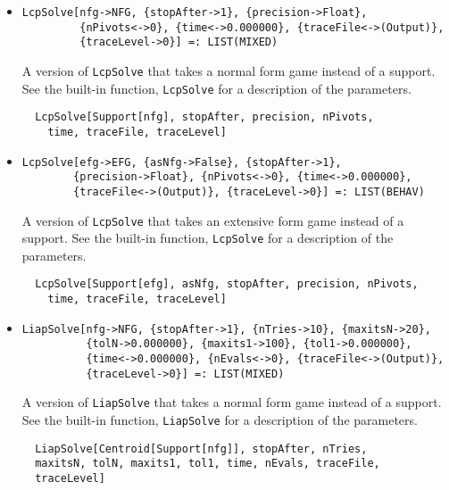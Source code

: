 \begin{itemize}



\item{}
\protect \large \begin{verbatim}
LcpSolve[nfg->NFG, {stopAfter->1}, {precision->Float}, 
         {nPivots<->0}, {time<->0.000000}, {traceFile<->(Output)}, 
         {traceLevel->0}] =: LIST(MIXED) 
\end{verbatim}\normalsize

\bd 
A version of \verb+LcpSolve+ that takes a normal form
game instead of a support.  See the built-in function,
\verb+LcpSolve+ for a description of the parameters.
\begin{verbatim}
  LcpSolve[Support[nfg], stopAfter, precision, nPivots,
    time, traceFile, traceLevel]
\end{verbatim} 
\ed

\item{}
\protect \large \begin{verbatim}
LcpSolve[efg->EFG, {asNfg->False}, {stopAfter->1}, 
        {precision->Float}, {nPivots<->0}, {time<->0.000000}, 
        {traceFile<->(Output)}, {traceLevel->0}] =: LIST(BEHAV) 
\end{verbatim}\normalsize

\bd 
A version of \verb+LcpSolve+ that takes an extensive form
game instead of a support.  See the built-in function,
\verb+LcpSolve+ for a description of the parameters.
\begin{verbatim}
  LcpSolve[Support[efg], asNfg, stopAfter, precision, nPivots,
    time, traceFile, traceLevel]
\end{verbatim} 
\ed

\item{}
\protect \large \begin{verbatim}
LiapSolve[nfg->NFG, {stopAfter->1}, {nTries->10}, {maxitsN->20}, 
          {tolN->0.000000}, {maxits1->100}, {tol1->0.000000}, 
          {time<->0.000000}, {nEvals<->0}, {traceFile<->(Output)}, 
          {traceLevel->0}] =: LIST(MIXED) 
\end{verbatim}\normalsize

\bd 
A version of \verb+LiapSolve+ that takes a normal form
game instead of a support.  See the built-in function,
\verb+LiapSolve+ for a description of the parameters.
\begin{verbatim}
  LiapSolve[Centroid[Support[nfg]], stopAfter, nTries,
  maxitsN, tolN, maxits1, tol1, time, nEvals, traceFile,
  traceLevel]
\end{verbatim} 
\ed


\end{itemize}
